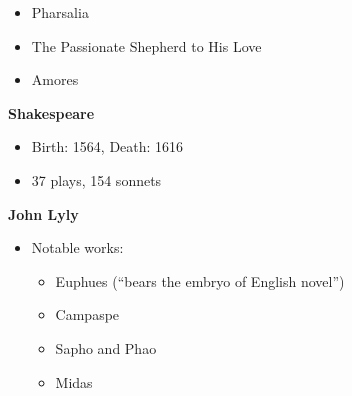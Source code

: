 \documentclass[
  12pt,
  ignorenonframetext,
  progressbar=frametitle]{beamer}
\providecommand{\tightlist}{%
  \setlength{\itemsep}{0pt}\setlength{\parskip}{0pt}}
\begin{document}
\begin{frame}[allowframebreaks]
\begin{itemize}
\begin{itemize}
    \begin{itemize}
    \tightlist
    \item
      Pharsalia
    \item
      The Passionate Shepherd to His Love
    \item
      Amores
    \end{itemize}
  \end{itemize}
\end{itemize}

\large\textbf{Shakespeare}\normalsize\vspace{-3mm}

\begin{itemize}
\tightlist
\item
  Birth: 1564, Death: 1616
\item
  37 plays, 154 sonnets
\end{itemize}

\large\textbf{John Lyly}\normalsize\vspace{-3mm}

\begin{itemize}
\tightlist
\item
  Notable works:

  \begin{itemize}
  \tightlist
  \item
    Euphues (``bears the embryo of English novel'')
  \item
    Campaspe
  \item
    Sapho and Phao
  \item
    Midas
  \end{itemize}
\end{itemize}
\end{frame}
\end{document}
